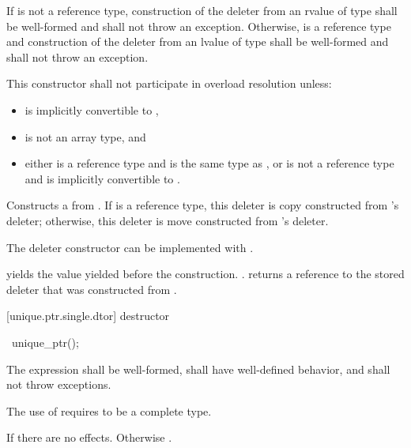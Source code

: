 \begin{itemdescr}
\pnum
\requires If  is not a reference type,
construction of the deleter from an rvalue of type
 shall be well-formed and shall not throw an exception.
Otherwise,  is a reference type and construction of the deleter from an
lvalue of type  shall be well-formed and shall not throw an exception.

\pnum
\remarks This constructor shall not participate in overload resolution unless:

\begin{itemize}
\item {} is implicitly convertible to ,
\item {} is not an array type, and
\item either  is a reference type and  is the same type as , or
 is not a reference type and  is implicitly convertible to .
\end{itemize}

\pnum
\effects Constructs a  from .
If  is a reference type, this deleter is copy constructed from
's deleter; otherwise, this deleter is move constructed from 's
deleter. \begin{note} The deleter constructor can be implemented with
. \end{note}

\pnum
\postconditions {} yields the value 
yielded before the construction. .
 returns a reference
to the stored deleter that was constructed from
.
\end{itemdescr}

[unique.ptr.single.dtor]{ destructor}

%
\begin{itemdecl}
~unique_ptr();
\end{itemdecl}

\begin{itemdescr}
\pnum
\requires The expression  shall be well-formed,
shall have well-defined behavior, and shall not throw exceptions. \begin{note} The
use of  requires  to be a complete type.
\end{note}

\pnum
\effects If  there are no effects.
Otherwise .
\end{itemdescr}

